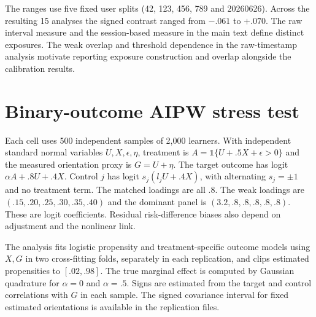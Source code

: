 The ranges use five fixed user splits (42, 123, 456, 789 and 20260626). Across the resulting 15 analyses the signed contrast ranged from $-.061$ to $+.070$. The raw interval measure and the session-based measure in the main text define distinct exposures. The weak overlap and threshold dependence in the raw-timestamp analysis motivate reporting exposure construction and overlap alongside the calibration results.

\clearpage
\section{Binary-outcome AIPW stress test}
\label{app:binary-stress}

Each cell uses 500 independent samples of 2,000 learners. With independent standard normal variables $U,X,\epsilon,\eta$, treatment is $A=\mathbb{1}\{U+.5X+\epsilon>0\}$ and the measured orientation proxy is $G=U+\eta$. The target outcome has logit $\alpha A+.8U+.4X$. Control $j$ has logit $s_j(l_j U+.4X)$, with alternating $s_j=\pm1$ and no treatment term. The matched loadings are all .8. The weak loadings are $(.15,.20,.25,.30,.35,.40)$ and the dominant panel is $(3.2,.8,.8,.8,.8,.8)$. These are logit coefficients. Residual risk-difference biases also depend on adjustment and the nonlinear link.

The analysis fits logistic propensity and treatment-specific outcome models using $X,G$ in two cross-fitting folds, separately in each replication, and clips estimated propensities to $[.02,.98]$. The true marginal effect is computed by Gaussian quadrature for $\alpha=0$ and $\alpha=.5$. Signs are estimated from the target and control correlations with $G$ in each sample. The signed covariance interval for fixed estimated orientations is available in the replication files.


